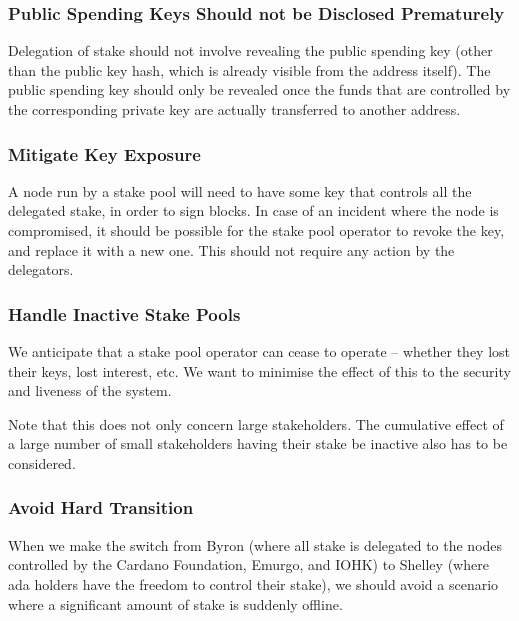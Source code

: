 \documentclass[11pt,a4paper,dvipsnames,twosided]{article}
\begin{document}
\subsubsection{Public Spending Keys Should not be Disclosed Prematurely}
\label{public-spending-keys-should-not-be-disclosed-prematurely}

Delegation of stake should not involve revealing the public spending key (other
than the public key hash, which is already visible from the address itself). The
public spending key should only be revealed once the funds that are controlled
by the corresponding private key are actually transferred to another address.

\subsubsection{Mitigate Key Exposure}
\label{mitigate-key-exposure}

A node run by a stake pool will need to have some key that controls all
the delegated stake, in order to sign blocks. In case of an incident
where the node is compromised, it should be possible for the stake pool
operator to revoke the key, and replace it with a new one. This should
not require any action by the delegators.

\subsubsection{Handle Inactive Stake Pools}
\label{handle-inactive-stake-pools}

We anticipate that a stake pool operator can cease to operate -- whether
they lost their keys, lost interest, etc. We want to minimise the
effect of this to the security and liveness of the system.


Note that this does not only concern large stakeholders. The cumulative effect
of a large number of small stakeholders having their stake be inactive also has
to be considered.


\subsubsection{Avoid Hard Transition}
\label{avoid-hard-transition}

When we make the switch from Byron (where all stake is delegated to the
nodes controlled by the Cardano Foundation, Emurgo, and IOHK) to Shelley
(where ada holders have the freedom to control their stake), we should
avoid a scenario where a significant amount of stake is suddenly
offline.
\end{document}
